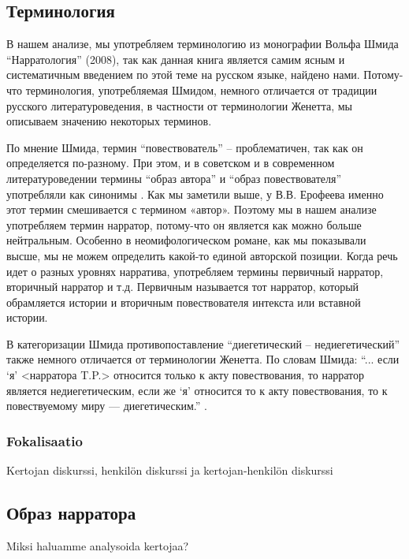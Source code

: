 \documentclass[12pt,a4paper]{article}
\begin{document}
\subsection{Терминология}

В нашем анализе, мы употребляем терминологию из монографии Вольфа Шмида \enquote{Нарратология} (2008), так как данная книга является самим ясным и систематичным введением по этой теме на русском языке, найдено нами. Потому-что терминология, употребляемая Шмидом, немного отличается от традиции русского литературоведения, в частности от терминологии Женетта, мы описываем значению некоторых терминов.
  
По мнение Шмида, термин \enquote{повествователь} -- проблематичен, так как он
определяется по-разному. При этом, и в советском и в современном
литературоведении термины \enquote{образ автора} и \enquote{образ повествователя} употребляли как
синонимы \parencite[67--68]{schmid2008}.  Как мы заметили выше, у В.В.
Ерофеева именно этот термин смешивается с термином «автор». Поэтому мы в нашем анализе
употребляем термин нарратор, потому-что он является как можно больше
нейтральным. Особенно в неомифологическом романе, как мы показывали высше, мы не можем определить какой-то единой авторской позиции.  Когда речь идет о разных уровнях нарратива, употребляем термины
первичный нарратор, вторичный нарратор и т.д. Первичным называется тот нарратор,
который  обрамляется истории и вторичным повествователя интекста или вставной истории.

В категоризации Шмида противопоставление \enquote{диегетический -- недиегетический} также немного отличается от терминологии Женетта. По словам Шмида: \enquote{... если \enquote{я} <нарратора T.P.> относится только к акту повествования, то нарратор является недиегетическим, если же \enquote{я} относится то к акту повествования, то к повествуемому миру — диегетическим.} \parencite[84]{schmid2008}.

\subsubsection{Fokalisaatio}
Kertojan diskurssi, henkilön diskurssi ja kertojan-henkilön diskurssi

\subsection{Образ нарратора}

Miksi haluamme analysoida kertojaa? 
\end{document}
